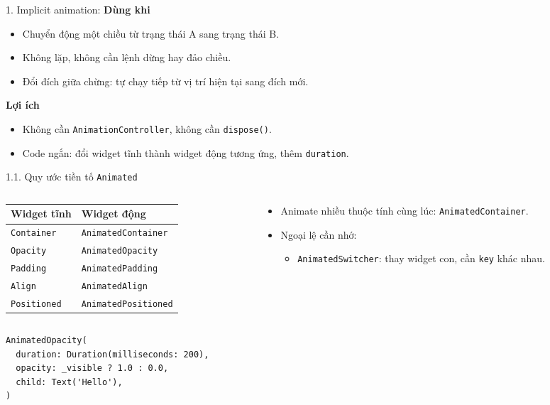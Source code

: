 \documentclass[aspectratio=169,10pt]{beamer}
\begin{document}
\begin{frame}{1. Implicit animation:}
  \textbf{Dùng khi}
  \begin{itemize}
    \item Chuyển động một chiều từ trạng thái A sang trạng thái B.
    \item Không lặp, không cần lệnh dừng hay đảo chiều.
    \item Đổi đích giữa chừng: tự chạy tiếp từ vị trí hiện tại sang đích mới.
  \end{itemize}
  \vspace{0.3cm}
  \textbf{Lợi ích}
  \begin{itemize}
    \item Không cần \texttt{AnimationController}, không cần \texttt{dispose()}.
    \item Code ngắn: đổi widget tĩnh thành widget động tương ứng, thêm \texttt{duration}.
  \end{itemize}
\end{frame}

\begin{frame}[fragile]{1.1. Quy ước tiền tố \texttt{Animated}}
  \begin{columns}[T]
  \begin{column}{0.45\textwidth}
  \begin{tabular}{ll}
    \toprule
    \textbf{Widget tĩnh} & \textbf{Widget động} \\
    \midrule
    \texttt{Container} & \texttt{AnimatedContainer} \\
    \texttt{Opacity} & \texttt{AnimatedOpacity} \\
    \texttt{Padding} & \texttt{AnimatedPadding} \\
    \texttt{Align} & \texttt{AnimatedAlign} \\
    \texttt{Positioned} & \texttt{AnimatedPositioned} \\
    \bottomrule
  \end{tabular}
  \end{column}
  \begin{column}{0.53\textwidth}
  \begin{itemize}
    \item Animate nhiều thuộc tính cùng lúc: \texttt{AnimatedContainer}.
    \item Ngoại lệ cần nhớ:
    \begin{itemize}
      \item \texttt{AnimatedSwitcher}: thay widget con, cần \texttt{key} khác nhau.
    \end{itemize}
  \end{itemize}
  \end{column}
  \end{columns}
\begin{lstlisting}[frame=single,
  basicstyle=\fontfamily{phv}\selectfont\footnotesize]
AnimatedOpacity(
  duration: Duration(milliseconds: 200),
  opacity: _visible ? 1.0 : 0.0,
  child: Text('Hello'),
)
\end{lstlisting}
\end{frame}
\end{document}
